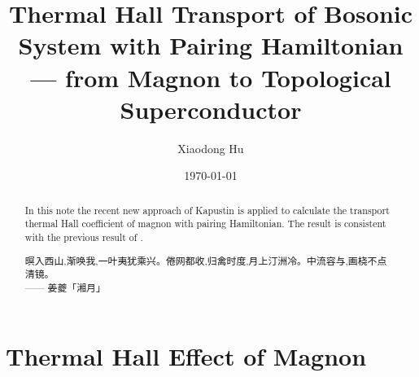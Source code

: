 \documentclass[10pt,nofootinbib]{revtex4}
\begin{document}
\title{Thermal Hall Transport of Bosonic System with Pairing Hamiltonian --- from Magnon to Topological Superconductor}
\author{Xiaodong Hu}

\date{\today}

\begin{abstract}
	In this note the recent new approach of Kapustin \cite{kapustin2019thermal} is applied to calculate the transport thermal Hall coefficient of magnon with pairing Hamiltonian. The result is consistent with the previous result of \cite{matsumoto2014thermal}.\par
		\hfill\par
		{\centering\kaishu 暝入西山,渐唤我,一叶夷犹乘兴。倦网都收,归禽时度,月上汀洲冷。中流容与,画桡不点清镜。\\[0.5em]}
	\hfill------ 姜夔「湘月」
\end{abstract}

\maketitle
\tableofcontents


\section{Thermal Hall Effect of Magnon}
\end{document}
